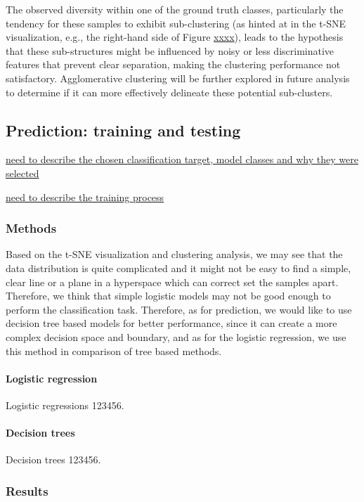 \documentclass{article}
\begin{document}
The observed diversity within one of the ground truth classes, particularly the tendency for these samples to exhibit sub-clustering (as hinted at in the t-SNE visualization, e.g., the right-hand side of Figure \underline{xxxx}), leads to the hypothesis that these sub-structures might be influenced by noisy or less discriminative features that prevent clear separation, making the clustering performance not satisfactory. Agglomerative clustering will be further explored in future analysis to determine if it can more effectively delineate these potential sub-clusters.

\subsection{Prediction: training and testing}

\underline{need to describe the chosen classification target, model classes and why they were selected}

\underline{need to describe the training process}


\subsubsection*{Methods}

Based on the t-SNE visualization and clustering analysis, we may see that the data distribution is quite complicated and it might not be easy to find a simple, clear line or a plane in a hyperspace which can correct set the samples apart. Therefore, we think that simple logistic models may not be good enough to perform the classification task.  Therefore, as for prediction, we would like to use decision tree based models for better performance, since it can create a more complex decision space and boundary, and as for the logistic regression, we use this method in comparison of tree based methods.

\paragraph{Logistic regression} Logistic regressions 123456.

\paragraph{Decision trees} Decision trees 123456.

\subsubsection*{Results}
\end{document}
